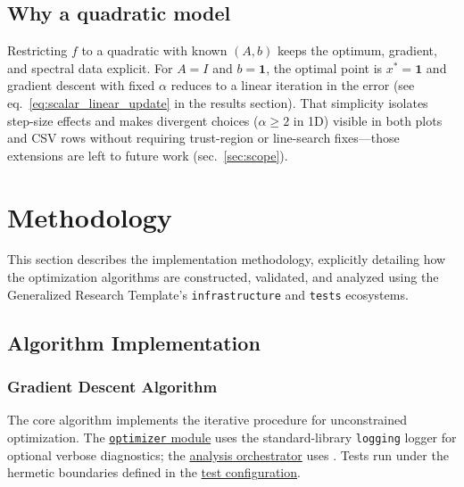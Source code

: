 \documentclass[
  english,
]{article}
\begin{document}
\subsection{Why a quadratic model}\label{why-a-quadratic-model}

Restricting \(f\) to a quadratic with known \((A,b)\) keeps the optimum,
gradient, and spectral data explicit. For \(A = I\) and
\(b = \mathbf{1}\), the optimal point is \(x^\ast = \mathbf{1}\) and
gradient descent with fixed \(\alpha\) reduces to a linear iteration in
the error (see eq.~\ref{eq:scalar_linear_update} in the results
section). That simplicity isolates step-size effects and makes divergent
choices (\(\alpha \geq 2\) in 1D) visible in both plots and CSV rows
without requiring trust-region or line-search fixes---those extensions
are left to future work (sec.~\ref{sec:scope}).

\newpage

\section{Methodology}\label{sec:methodology}

This section describes the implementation methodology, explicitly
detailing how the optimization algorithms are constructed, validated,
and analyzed using the Generalized Research Template's
\texttt{infrastructure} and \texttt{tests} ecosystems.

\subsection{Algorithm Implementation}\label{algorithm-implementation}

\subsubsection{Gradient Descent
Algorithm}\label{gradient-descent-algorithm}

The core algorithm implements the iterative procedure for unconstrained
optimization. The
\href{https://github.com/docxology/template/blob/main/projects/templates/template_code_project/src/optimizer.py}{\texttt{optimizer}
module} uses the standard-library \texttt{logging} logger for optional
verbose diagnostics; the
\href{https://github.com/docxology/template/blob/main/projects/templates/template_code_project/scripts/optimization_analysis.py}{analysis
orchestrator} uses
. Tests run under
the hermetic boundaries defined in the
\href{https://github.com/docxology/template/blob/main/projects/templates/template_code_project/tests/conftest.py}{test
configuration}.
\end{document}
